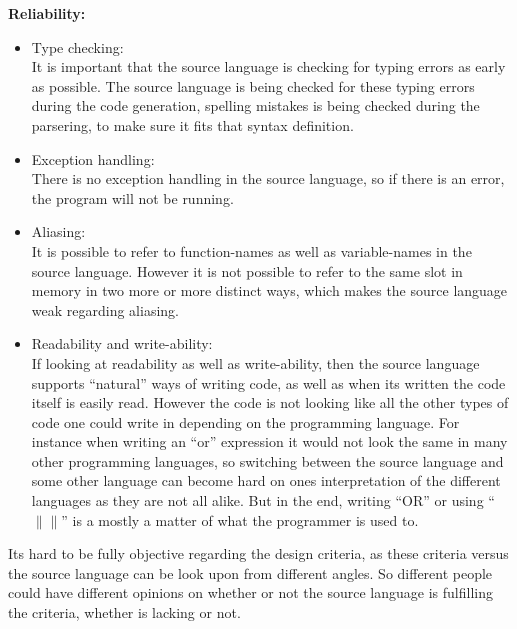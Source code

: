 \textbf{Reliability:} \\
\begin{itemize}
\item Type checking: \\
It is important that the source language is checking for typing errors as early as possible. The source language is being checked for these typing errors during the code generation, spelling mistakes is being checked during the parsering, to make sure it fits that syntax definition.
\item Exception handling: \\
There is no exception handling in the source language, so if there is an error, the program will not be running.
\item Aliasing: \\
It is possible to refer to function-names as well as variable-names in the source language. However it is not possible to refer to the same slot in memory in two more or more distinct ways, which makes the source language weak regarding aliasing. 
\item Readability and write-ability: \\
If looking at readability as well as write-ability, then the source language supports ``natural'' ways of writing code, as well as when its written the code itself is easily read. However the code is not looking like all the other types of code one could write in depending on the programming language. For instance when writing an ``or'' expression it would not look the same in many other programming languages, so switching between the source language and some other language can become hard on ones interpretation of the different languages as they are not all alike. But in the end, writing ``OR'' or using ``$\|\|$'' is a mostly a matter of what the programmer is used to. 
\end{itemize}
Its hard to be fully objective regarding the design criteria, as these criteria versus the source language can be look upon from different angles. So different people could have different opinions on whether or not the source language is fulfilling the criteria, whether is lacking or not. 
